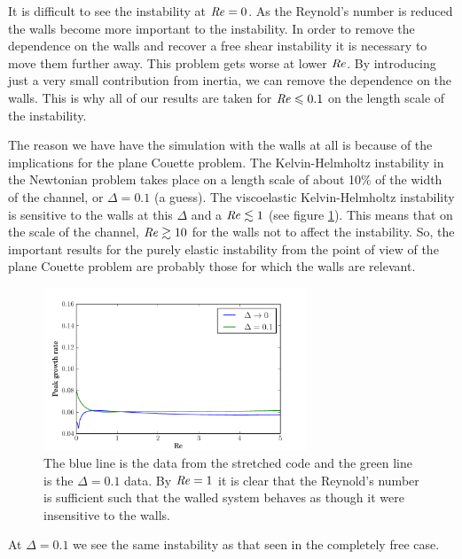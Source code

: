 \documentclass{jfm}
\newcommand\Rey{\mbox{\textit{Re}}}  %
\begin{document}
It is difficult to see the instability at $\Rey = 0$. As the Reynold's number is reduced the walls become more important to the instability. In order to remove the dependence on the walls and recover a free shear instability it is necessary to move them further away. This problem gets worse at lower $\Rey$. By introducing just a very small contribution from inertia, we can remove the dependence on the walls. This is why all of our results are taken for $\Rey \leq 0.1$ on the length scale of the instability.

The reason we have have the simulation with the walls at all is because of the implications for the plane Couette problem. The Kelvin-Helmholtz instability in the Newtonian problem takes place on a length scale of about 10\% of the width of the channel, or $\Delta = 0.1$ (a guess). The viscoelastic Kelvin-Helmholtz instability is sensitive to the walls at this $\Delta$ and a $\Rey \lesssim 1$ (see figure \ref{fig:vary_Re_delta_conv}). This means that on the scale of the channel, $\Rey \gtrsim 10$ for the walls not to affect the instability. So, the important results for the purely elastic instability from the point of view of the plane Couette problem are probably those for which the walls are relevant. 

\begin{figure}
    \centering
    \includegraphics[width=0.7\textwidth]{vary_Re_delta_conv}
    \caption{The blue line is the data from the stretched code and the green line is the $\Delta = 0.1$ data. By $\Rey = 1$ it is clear that the Reynold's number is sufficient such that the walled system behaves as though it were insensitive to the walls.}
    \label{fig:vary_Re_delta_conv}
\end{figure}

At $\Delta = 0.1$ we see the same instability as that seen in the completely free case. 
\end{document}
